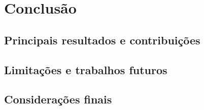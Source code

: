 
\chapter{Conclusão}\label{cap: Conclusão}

\section{\textbf{Principais resultados e contribuições}}

\section{\textbf{Limitações e trabalhos futuros}}

\section{\textbf{Considerações finais}}